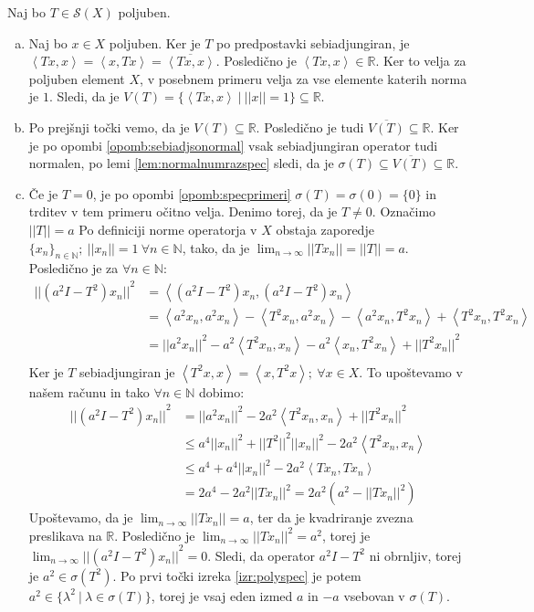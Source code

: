 \documentclass[mat2]{matdelo}
\newcommand{\R}{\mathbb{R}}
\newcommand{\N}{\mathbb{N}}
\newcommand{\abs}[1]{\ensuremath{\lvert #1 \rvert}}
\newcommand{\norm}[1]{\abs{\abs{#1}}}
\newcommand{\Sp}[2]{\ensuremath{\left<#1, #2\right>}}
\begin{document}
		\begin{dokaz}
			Naj bo $T\in \mathcal{S}(X)$ poljuben.
			\begin{enumerate}[a)]
				\item Naj bo $x\in X$ poljuben. Ker je $T$ po predpostavki sebiadjungiran, je $\Sp{Tx}{x} = \Sp{x}{Tx} = \overline{\Sp{Tx}{x}}$. Posledično je $\Sp{Tx}{x}\in \R$. Ker to velja za poljuben element $X$, v posebnem primeru velja za vse elemente katerih norma je $1$. Sledi, da je $V(T)=\{\Sp{Tx}{x}~|~\norm{x}=1\}\subseteq \R$.
				\item Po prejšnji točki vemo, da je $V(T)\subseteq \R$. Posledično je tudi $\overline{V(T)}\subseteq\R$. Ker je po opombi \ref{opomb:sebiadjsonormal} vsak sebiadjungiran operator tudi normalen, po lemi \ref{lem:normalnumrazspec} sledi, da je $\sigma(T)\subseteq\overline{V(T)}\subseteq \R$.
				\item Če je $T=0$, je po opombi \ref{opomb:specprimeri} $\sigma(T) = \sigma(0)=\{0\}$ in trditev v tem primeru očitno velja. Denimo torej, da je $T\neq 0$. Označimo $\norm{T} = a$ Po definiciji norme operatorja v $X$ obstaja zaporedje $\{x_n\}_{n\in\N};~\norm{x_n}=1~\forall n\in\N$, tako, da je $\lim_{n\to\infty}\norm{Tx_n} = \norm{T} = a$. Posledično je za $\forall n\in\N$: \begin{align*}
					\norm{(a^2I - T^2)x_n}^2 &= \Sp{(a^2I - T^2)x_n}{(a^2I - T^2)x_n} \\
					&= \Sp{a^2x_n}{a^2x_n} - \Sp{T^2x_n}{a^2x_n} - \Sp{a^2x_n}{T^2x_n} + \Sp{T^2x_n}{T^2x_n} \\
					&= \norm{a^2x_n}^2 - a^2\Sp{T^2x_n}{x_n} - a^2\Sp{x_n}{T^2x_n} + \norm{T^2x_n}^2 \\
				\end{align*}
				Ker je $T$ sebiadjungiran je $\Sp{T^2x}{x} = \Sp{x}{T^2x};~\forall x\in X$. To upoštevamo v našem računu in tako $\forall n\in\N$ dobimo: 
				\begin{align*}
					\norm{(a^2I - T^2)x_n}^2 &= \norm{a^2x_n}^2 - 2a^2\Sp{T^2x_n}{x_n} + \norm{T^2x_n}^2 \\
					&\leq a^4\norm{x_n}^2 + \norm{T^2}^2\norm{x_n}^2 - 2a^2\Sp{T^2x_n}{x_n}  \\
					&\leq a^4 + a^4\norm{x_n}^2 - 2a^2\Sp{Tx_n}{Tx_n}  \\
					&= 2a^4 - 2a^2\norm{Tx_n}^2 = 2a^2(a^2 - \norm{Tx_n}^2)
				\end{align*}
				Upoštevamo, da je $\lim_{n\to\infty}\norm{Tx_n} = a$, ter da je kvadriranje zvezna preslikava na $\R$. Posledično je $\lim_{n\to\infty}\norm{Tx_n}^2 = a^2$, torej je $\lim_{n\to\infty}\norm{(a^2I - T^2)x_n}^2 = 0$. Sledi, da operator $a^2I - T^2$ ni obrnljiv, torej je $a^2 \in \sigma(T^2)$. Po prvi točki izreka \ref{izr:polyspec} je potem $a^2\in \{\lambda^2~|~\lambda\in \sigma(T)\}$, torej je vsaj eden izmed $a$ in $-a$ vsebovan v $\sigma(T)$.

\end{enumerate}
\end{dokaz}
\end{document}
